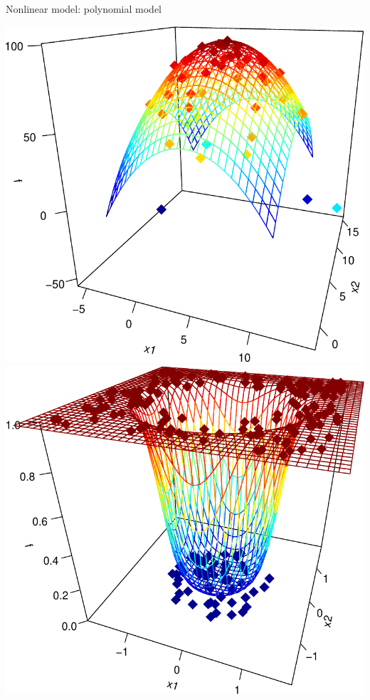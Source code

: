 \documentclass[ignorenonframetext,aspectratio=169]{beamer}
\begin{document}
\begin{frame}{Nonlinear model: polynomial model}
\protect\hypertarget{nonlinear-model-polynomial-model}{}

\begin{center}\includegraphics[height=0.4\textheight]{lecture10_files/figure-beamer/figures-side-1} \includegraphics[height=0.4\textheight]{lecture10_files/figure-beamer/figures-side-2} \end{center}


\end{frame}
\end{document}
